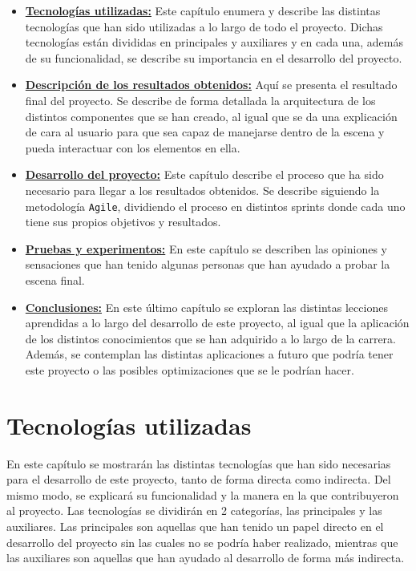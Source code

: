 \documentclass[a4paper, 12pt]{book}
\begin{document}
\begin{itemize}
  \item \hyperref[chap:tecnologias]{\textbf{Tecnologías utilizadas:}} Este capítulo enumera y describe las distintas tecnologías que han sido utilizadas a lo largo de todo el proyecto. Dichas tecnologías están divididas en principales y auxiliares y en cada una, además de su funcionalidad, se describe su importancia en el desarrollo del proyecto.
  \item \hyperref[chap:resultados]{\textbf{Descripción de los resultados obtenidos:}} Aquí se presenta el resultado final del proyecto. Se describe de forma detallada la arquitectura de los distintos componentes que se han creado, al igual que se da una explicación de cara al usuario para que sea capaz de manejarse dentro de la escena y pueda interactuar con los elementos en ella. 
  \item \hyperref[chap:Desarrollo del proyecto]{\textbf{Desarrollo del proyecto:}} Este capítulo describe el proceso que ha sido necesario para llegar a los resultados obtenidos. Se describe siguiendo la metodología \texttt{Agile}, dividiendo el proceso en distintos sprints donde cada uno tiene sus propios objetivos y resultados.
  \item \hyperref[chap:pruebas-experimentos]{\textbf{Pruebas y experimentos:}} En este capítulo se describen las opiniones y sensaciones que han tenido algunas personas que han ayudado a probar la escena final. 
  \item \hyperref[chap:conclusiones]{\textbf{Conclusiones:}} En este último capítulo se exploran las distintas lecciones aprendidas a lo largo del desarrollo de este proyecto, al igual que la aplicación de los distintos conocimientos que se han adquirido a lo largo de la carrera. Además, se contemplan las distintas aplicaciones a futuro que podría tener este proyecto o las posibles optimizaciones que se le podrían hacer.
\end{itemize}


\cleardoublepage %
\chapter{Tecnologías utilizadas} 
\label{chap:tecnologias} %
En este capítulo se mostrarán las distintas tecnologías que han sido necesarias para el desarrollo de este proyecto, tanto de forma directa como indirecta. Del mismo modo, se explicará su funcionalidad
y la manera en la que contribuyeron al proyecto. Las tecnologías se dividirán en 2 categorías, las principales y las auxiliares. Las principales son aquellas que han tenido un papel directo en el desarrollo 
del proyecto sin las cuales no se podría haber realizado, mientras que las auxiliares son aquellas que han ayudado al desarrollo de forma más indirecta.  
\end{document}
